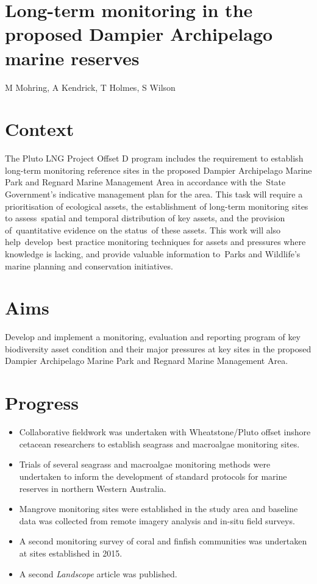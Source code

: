 \documentclass[version=last,
    paper=a4,                               %
    10pt,                                   %
    dvipsnames,
    oneside,                              %
    headings=openany,                       %
    open=any,
    BCOR=7mm,                               %
    DIV=15,     %
]{scrbook}
\begin{document}
\section*{Long-term monitoring in the proposed Dampier Archipelago marine reserves
}

M Mohring, A Kendrick, T Holmes, S Wilson



\section*{Context}

The Pluto LNG Project Offset D program includes the requirement to
establish long-term monitoring reference sites in the proposed Dampier
Archipelago Marine Park and Regnard Marine Management Area in accordance
with the~State Government's indicative management plan for the area.
This task will require a prioritisation of ecological assets, the
establishment of long-term monitoring sites to assess~spatial and
temporal distribution of key assets, and the provision of~quantitative
evidence on the status~of these assets. This work will also
help~develop~best practice monitoring techniques for assets and
pressures where knowledge is lacking, and provide valuable information
to~Parks and Wildlife's marine planning and conservation initiatives.




\section*{Aims}

Develop and implement a monitoring, evaluation and reporting program of
key biodiversity asset condition and their major pressures at key sites
in the proposed Dampier Archipelago Marine Park and Regnard Marine
Management Area.




\section*{Progress}

\begin{itemize}
\itemsep1pt\parskip0pt
\item
  Collaborative fieldwork was undertaken with Wheatstone/Pluto offset
  inshore cetacean researchers to establish seagrass and macroalgae
  monitoring sites.
\item
  Trials of several seagrass and macroalgae monitoring methods were
  undertaken to inform the development of standard protocols for marine
  reserves in northern Western Australia.
\item
  Mangrove monitoring sites were established in the study area and
  baseline data was collected from remote imagery analysis and in-situ
  field surveys.
\item
  A second monitoring survey of coral and finfish communities was
  undertaken at sites established in 2015.
\item
  A second \emph{Landscope} article was published.
\end{itemize}
\end{document}
